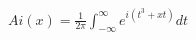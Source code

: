 \documentclass[preview]{standalone}
\begin{document}
\begin{align*}
Ai(x)=\displaystyle \frac{1}{2\pi}\int_{-\infty}^{\infty}e^{i(t^3+xt)} dt
\end{align*}
\end{document}

